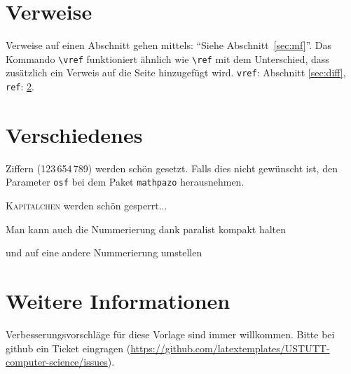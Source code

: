 \section{Verweise}
Verweise auf einen Abschnitt gehen mittels: ``Siehe Abschnitt~\vref{sec:mf}''. Das Kommando \texttt{\textbackslash{}vref} funktioniert ähnlich wie \texttt{\textbackslash{}ref} mit dem Unterschied, dass zusätzlich ein Verweis auf die Seite hinzugefügt wird. \texttt{vref}: Abschnitt \vref{sec:diff}, \texttt{ref}: \ref{sec:diff}.




\section{Verschiedenes}
\label{sec:diff}
\ifdeutsch
Ziffern (123\,654\,789) werden schön gesetzt. Falls dies nicht gewünscht ist, den Parameter \texttt{osf} bei dem Paket \texttt{mathpazo} herausnehmen.
\fi

\textsc{Kapitälchen} werden schön gesperrt...

\begin{compactenum}[I]
\item Man kann auch die Nummerierung dank paralist kompakt halten
\item und auf eine andere Nummerierung umstellen
\end{compactenum}

\section{Weitere Informationen}
Verbesserungsvorschläge für diese Vorlage sind immer willkommen. Bitte bei github ein Ticket eingragen (\url{https://github.com/latextemplates/USTUTT-computer-science/issues}).